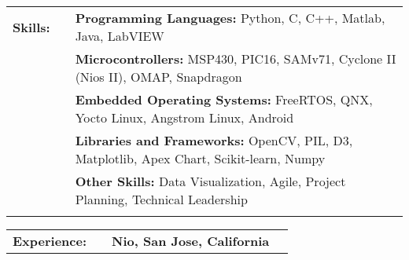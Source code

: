 \documentclass{minimal}
\begin{document}

\begin{center}
\fontsize{14}{12.8}\selectfont
\name\\
\fontsize{10}{12}\selectfont
\address\\
\phone\\
\email\\
\github\\
\end{center}
\vspace{0.5cm}

\begin{tabular}{ p{1.5cm} p{1cm} p{16cm} }
\textbf{Skills:} & & \textbf{Programming Languages:} Python, C, C++, Matlab, Java, LabVIEW\\
& & \textbf{Microcontrollers:} MSP430, PIC16, SAMv71, Cyclone II (Nios II), OMAP, Snapdragon\\
& & \textbf{Embedded Operating Systems:} FreeRTOS, QNX, Yocto Linux, Angstrom Linux, Android\\
& & \textbf{Libraries and Frameworks:} OpenCV, PIL, D3, Matplotlib, Apex Chart, Scikit-learn, Numpy\\
& & \textbf{Other Skills:} Data Visualization, Agile, Project Planning, Technical Leadership\\
& & \\
\end{tabular}

\begin{tabular}{ p{1.5cm} p{1cm} p{16cm} >{\raggedleft\arraybackslash}p{3cm} }
\textbf{Experience:} & & \textbf{Nio, San Jose, California} & \\
\end{tabular}
\end{document}
